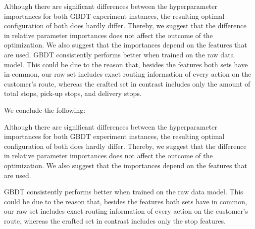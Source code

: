 Although there are significant differences between the hyperparameter importances for both GBDT experiment instances, the resulting optimal configuration of both does hardly differ. Thereby, we suggest that the difference in relative parameter importances does not affect the outcome of the optimization. We also suggest that the importances depend on the features that are used.
GBDT consistently performs better when trained on the raw data model. This could be due to the reason that, besides the features both sets have in common, our raw set includes exact routing information of every action on the customer's route, whereas the crafted set in contrast includes only the amount of total stops, pick-up stops, and delivery stops.

We conclude the following: 
\begin{description}[font=$\bullet$\scshape\bfseries]
	\item Although there are significant differences between the hyperparameter importances for both GBDT experiment instances, the resulting optimal configuration of both does hardly differ. Thereby, we suggest that the difference in relative parameter importances does not affect the outcome of the optimization. We also suggest that the importances depend on the features that are used.
	\item GBDT consistently performs better when trained on the raw data model. This could be due to the reason that, besides the features both sets have in common, our raw set includes exact routing information of every action on the customer's route, whereas the crafted set in contrast includes only the stop features.
\end{description}
\clearpage

